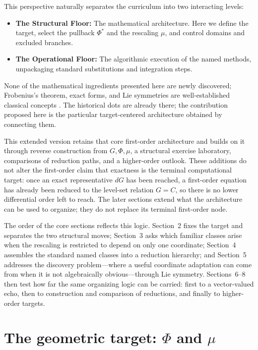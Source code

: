 \documentclass[11pt]{article}
\theoremstyle{definition}
\begin{document}
This perspective naturally separates the curriculum into two interacting levels:
\begin{itemize}
    \item \textbf{The Structural Floor:} The mathematical architecture. Here we define the target, select the pullback \(\Phi^*\) and the rescaling \(\mu\), and control domains and excluded branches.
    \item \textbf{The Operational Floor:} The algorithmic execution of the named methods, unpackaging standard substitutions and integration steps.
\end{itemize}

None of the mathematical ingredients presented here are newly discovered; Frobenius's theorem, exact forms, and Lie symmetries are well-established classical concepts \cite{Arnold1992, Hydon2000, Olver1993, Teschl2012}. The historical dots are already there; the contribution proposed here is the particular target-centered architecture obtained by connecting them. 


This extended version retains that core first-order architecture and builds on it through reverse construction from \(G,\Phi,\mu\), a structural exercise laboratory, comparisons of reduction paths, and a higher-order outlook. These additions do not alter the first-order claim that exactness is the terminal computational target: once an exact representative \(dG\) has been reached, a first-order equation has already been reduced to the level-set relation \(G=C\), so there is no lower differential order left to reach. The later sections extend what the architecture can be used to organize; they do not replace its terminal first-order node.

The order of the core sections reflects this logic. Section~2 fixes the target and separates the two structural moves; Section~3 asks which familiar classes arise when the rescaling is restricted to depend on only one coordinate; Section~4 assembles the standard named classes into a reduction hierarchy; and Section~5 addresses the discovery problem---where a useful coordinate adaptation can come from when it is not algebraically obvious---through Lie symmetry. Sections~6--8 then test how far the same organizing logic can be carried: first to a vector-valued echo, then to construction and comparison of reductions, and finally to higher-order targets.

\section{The geometric target: \texorpdfstring{\(\Phi\) and \(\mu\)}{Phi and mu}}
\end{document}
